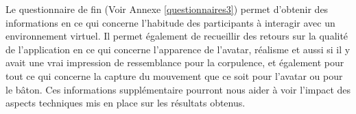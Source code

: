 Le questionnaire de fin (Voir Annexe \ref{questionnaires3}) permet d'obtenir des informations en ce qui concerne l'habitude des participants à interagir avec un environnement virtuel. Il permet également de recueillir des retours sur la qualité de l'application en ce qui concerne l'apparence de l'avatar, réalisme et aussi si il y avait une vrai impression de ressemblance pour la corpulence, et également pour tout ce qui concerne la capture du mouvement que ce soit pour l'avatar ou pour le bâton. Ces informations supplémentaire pourront nous aider à voir l'impact des aspects techniques mis en place sur les résultats obtenus.


